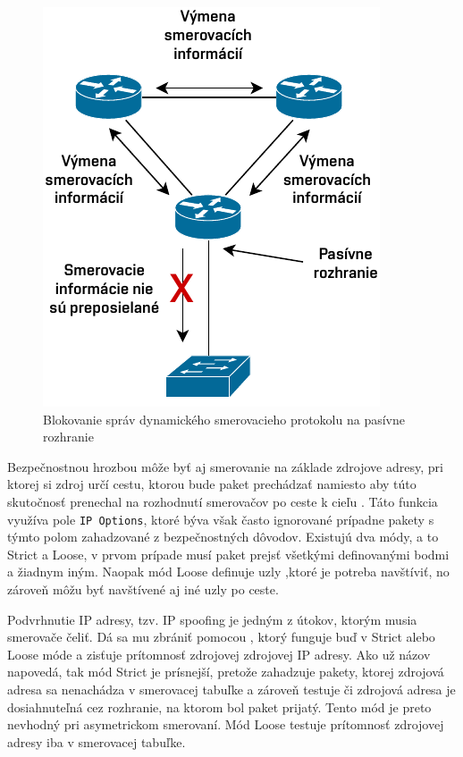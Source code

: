 \begin{figure}[H]
	\begin{center}
		\includegraphics[scale=1]{obrazky/passive-interface.pdf}
	\end{center}
	\caption[Blokovanie správ dynamického smerovacieho protokolu na pasívne rozhranie]{Blokovanie správ dynamického smerovacieho protokolu na pasívne rozhranie}
	\label{fig:passive-int}
\end{figure} 

Bezpečnostnou hrozbou môže byť aj smerovanie na základe zdrojove adresy, pri ktorej si zdroj určí cestu, ktorou bude paket prechádzať namiesto aby túto skutočnosť prenechal na rozhodnutí smerovačov po ceste k cieľu \cite{CIS_DrTLsgXv24lxeIIM}. Táto funkcia využíva pole \texttt{IP Options}, ktoré býva však často ignorované prípadne pakety s týmto polom zahadzované z bezpečnostných dôvodov. Existujú dva módy, a to Strict a Loose, v prvom prípade musí paket prejsť všetkými definovanými bodmi a žiadnym iným. Naopak mód Loose definuje uzly ,ktoré je potreba navštíviť, no zároveň môžu byť navštívené aj iné uzly po ceste.  

Podvrhnutie IP adresy, tzv. IP spoofing je jedným z útokov, ktorým musia smerovače čeliť. Dá sa mu zbrániť pomocou  \cite{Jackson2010}, ktorý funguje buď v Strict alebo Loose móde a zisťuje prítomnosť zdrojovej zdrojovej IP adresy. Ako už názov napovedá, tak mód Strict je prísnejší, pretože zahadzuje pakety, ktorej zdrojová adresa sa nenachádza v smerovacej tabuľke a zároveň testuje či zdrojová adresa je dosiahnuteľná cez rozhranie, na ktorom bol paket prijatý. Tento mód je preto nevhodný pri asymetrickom smerovaní. Mód Loose testuje prítomnosť zdrojovej adresy iba v smerovacej tabuľke. 

